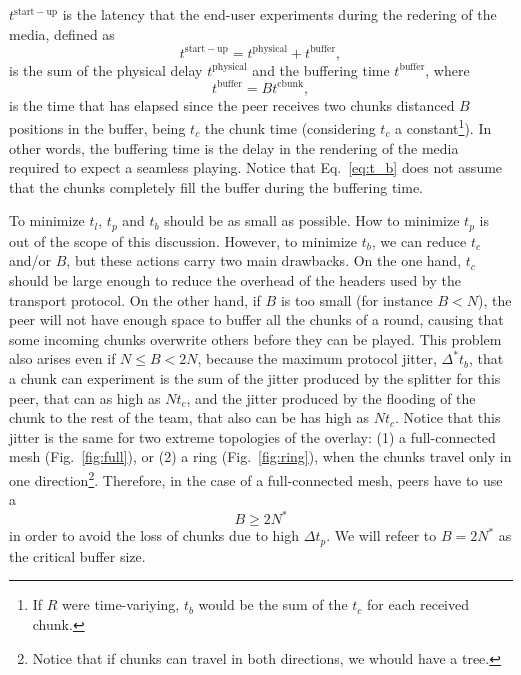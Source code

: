 

\label{sec:latency}


$t^{\mathrm{start-up}}$ is the latency that the end-user experiments
during the redering of the media, defined as
\begin{equation}
  \label{eq:t_startup}
  t^{\mathrm{start-up}} = t^{\mathrm{physical}} + t^{\mathrm{buffer}},
\end{equation}
is the sum of the physical
delay $t^{\mathrm{physical}}$ and the buffering time $t^{\mathrm{buffer}}$, where
\begin{equation}
  \label{eq:t_b}
  t^{\mathrm{buffer}} = Bt^{\mathrm{cbunk}},
\end{equation}
is the time that has elapsed since the peer receives two chunks
distanced $B$ positions in the buffer, being $t_c$ the chunk time (considering $t_c$ a
constant\footnote{If $R$ were time-variying, $t_b$ would be the sum of
  the $t_c$ for each received chunk.}). In other words, the buffering
time is the delay in the rendering of the media required to expect a
seamless playing. Notice that Eq.~\ref{eq:t_b} does not assume that
the chunks completely fill the buffer during the buffering time.

To minimize $t_l$, $t_p$ and $t_b$ should be as small as possible. How
to minimize $t_p$ is out of the scope of this discussion. However, to
minimize $t_b$, we can reduce $t_c$ and/or $B$, but these actions
carry two main drawbacks. On the one hand, $t_c$ should be large
enough to reduce the overhead of the headers used by the transport
protocol. On the other hand, if $B$ is too small (for instance $B<N$),
the peer will not have enough space to buffer all the chunks of a
round, causing that some incoming chunks overwrite others before they
can be played. This problem also arises even if $N\leq B<2N$, because
the maximum protocol jitter, $\Delta^* t_b$, that a chunk can
experiment is the sum of the jitter produced by the splitter for this
peer, that can as high as $Nt_c$, and the jitter produced by the
flooding of the chunk to the rest of the team, that also can be has
high as $Nt_c$. Notice that this jitter is the same for two extreme
topologies of the overlay: (1) a full-connected mesh
(Fig.~\ref{fig:full}), or (2) a ring (Fig.~\ref{fig:ring}), when the
chunks travel only in one direction\footnote{Notice that if chunks can
  travel in both directions, we whould have a tree.}. Therefore, in
the case of a full-connected mesh, peers have to use a
\begin{equation}
  \label{eq:minimum_B}
  B\ge 2N^*
\end{equation}
in order to avoid the loss of chunks due to high $\Delta t_p$. We will
refeer to $B=2N^*$ as the critical buffer size.

